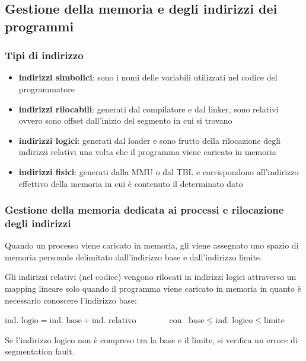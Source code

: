 \documentclass[a4paper]{article}
\begin{document}

\subsection{Gestione della memoria e degli indirizzi dei programmi}
\subsubsection*{Tipi di indirizzo}
\begin{itemize}
	\item \textbf{indirizzi simbolici}: sono i nomi delle variabili utilizzati nel codice del programmatore
	\item \textbf{indirizzi rilocabili}: generati dal compilatore e dal linker, sono relativi ovvero sono offset dall'inizio
	del segmento in cui si trovano
	\item \textbf{indirizzi logici}: generati dal loader e sono frutto della rilocazione degli indirizzi relativi
	una volta che il programma viene caricato in memoria
	\item \textbf{indirizzi fisici}: generati dalla MMU o dal TBL e corrispondono all'indirizzo effettivo della memoria in cui
	è contenuto il determinato dato
\end{itemize}

\subsubsection*{Gestione della memoria dedicata ai processi e rilocazione degli indirizzi}
Quando un processo viene caricato in memoria, gli viene assegnato uno spazio di memoria personale delimitato dall'indirizzo base
e dall'indirizzo limite. 

Gli indirizzi relativi (nel codice) vengono rilocati in indirizzi logici attraverso un mapping lineare solo quando il
programma viene caricato in memoria in quanto è necessario conoscere l'indirizzo base:
\begin{center}
	\vspace{-5pt}
	\(\text{ind. logio} = \text{ind. base} + \text{ind. relativo} \qquad\qquad \text{con} \;\;\; \text{base} \leq \text{ind. logico} \leq \text{limite}\)
	\vspace{-5pt}
\end{center}
Se l'indirizzo logico non è compreso tra la base e il limite, si verifica un errore di segmentation fault.
\end{document}
